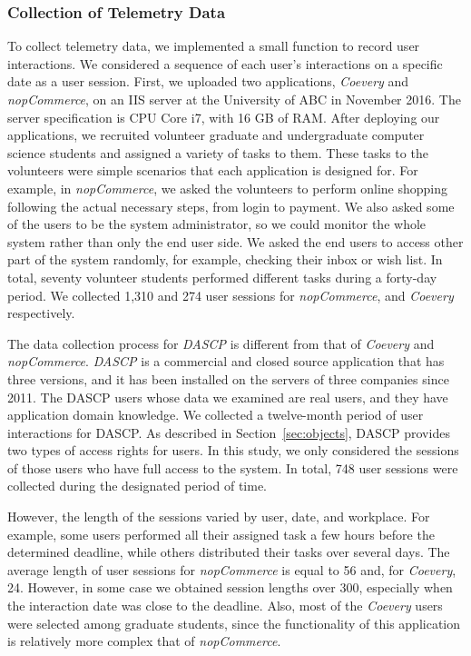 \subsubsection{Collection of Telemetry Data}
To collect telemetry data, we implemented a small function to record user interactions. 
We considered a sequence of each user's interactions on a specific date as a user session.
First, we uploaded two applications, {\em Coevery} and {\em nopCommerce}, on an IIS server 
at the University of ABC in November 2016. 
The server specification is CPU Core i7, with 16 GB of RAM.
After deploying our applications, we recruited volunteer graduate and undergraduate
computer science students and assigned a variety of tasks to them. 
These tasks to the volunteers were simple scenarios that each application is designed for.
For example, in {\em nopCommerce}, we asked the volunteers to perform online shopping 
following the actual necessary steps, from login to payment. We also asked some of 
the users to be the system administrator, so we could monitor the whole system 
rather than only the end user side.
We asked the end users to access other part of the system randomly, for example,
checking their inbox or wish list.  
In total, seventy volunteer students performed different tasks during a forty-day period.  
We collected 1,310 and 274 user sessions for {\em nopCommerce}, 
and {\em Coevery} respectively. 
 
The data collection process for {\em DASCP} is different from that of {\em Coevery} 
and {\em nopCommerce}. {\em DASCP} is a commercial and closed source application 
that has three versions, and it has been installed on the servers of three companies since 2011. 
The DASCP users whose data we examined are real users, and they have application domain knowledge.
We collected a twelve-month period of user interactions for DASCP.
As described in Section~\ref{sec:objects}, DASCP provides two types of access rights for users.
In this study, we only considered the sessions of those users who have full access to the system.
In total, 748 user sessions were collected during the designated period of time. 

However, the length of the sessions varied by user, date, and workplace.
For example, some users performed all their assigned task a few hours before the
determined deadline, while others distributed their tasks over several days.
The average length of user sessions for {\em nopCommerce} is equal to 56 and, for
{\em Coevery}, 24. However, in some case we obtained session lengths over 
300, especially when the interaction date was close to the deadline. 
Also, most of the {\em Coevery} users were selected among graduate students, since the
functionality of this application is relatively more complex that of {\em nopCommerce}. 

